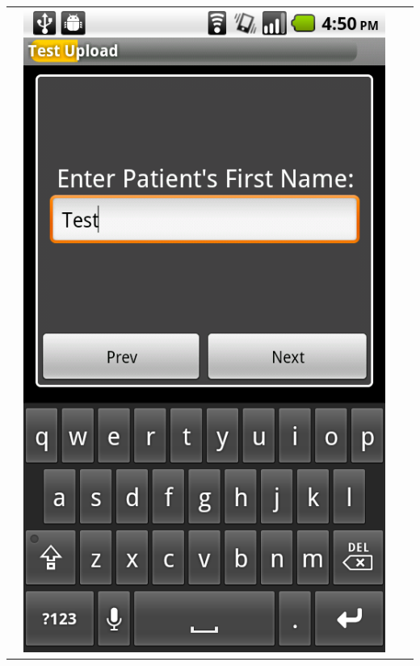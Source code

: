 \documentclass[a4paper,10pt]{article}
\begin{document}
\begin{flushleft}
\begin{tabular}{ c c c c }
&\includegraphics[scale=0.15,keepaspectratio=true]{client_proc_pt_first.png}

\end{tabular}
\end{flushleft}
\end{document}
